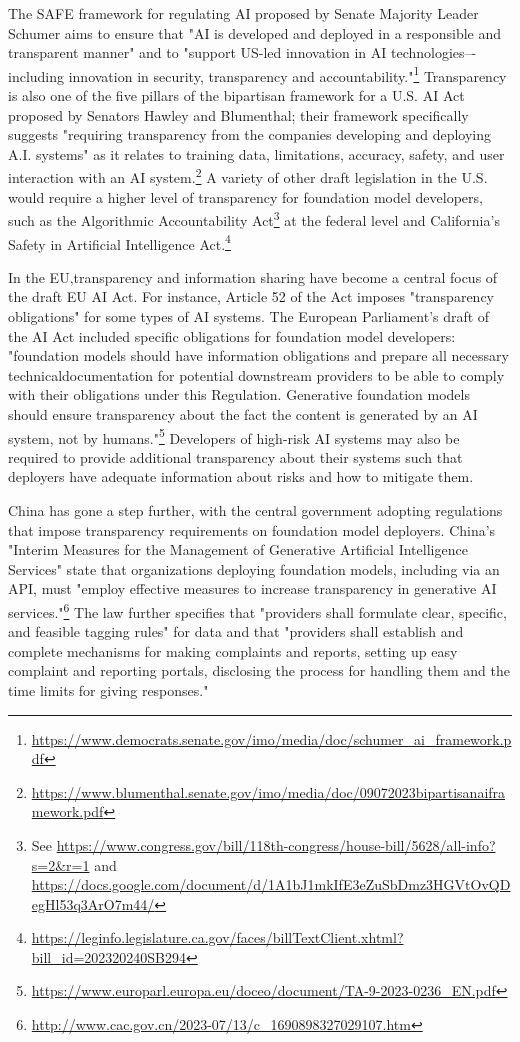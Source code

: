 \documentclass[screen, authorversion, acmsmall]{acmart}
\begin{document}
The SAFE framework for regulating AI proposed by Senate Majority Leader Schumer aims to ensure that "AI is developed and deployed in a responsible and transparent manner" and to "support US-led innovation in AI technologies–-including innovation in security, transparency and accountability."\footnote{\url{https://www.democrats.senate.gov/imo/media/doc/schumer_ai_framework.pdf}}
Transparency is also one of the five pillars of the bipartisan framework for a U.S. AI Act proposed by Senators Hawley and Blumenthal; their framework specifically suggests "requiring transparency from the companies developing and deploying A.I. systems" as it relates to training data, limitations, accuracy, safety, and user interaction with an AI system.\footnote{\url{https://www.blumenthal.senate.gov/imo/media/doc/09072023bipartisanaiframework.pdf}}
A variety of other draft legislation in the U.S. would require a higher level of transparency for foundation model developers, such as the Algorithmic Accountability Act\footnote{See \url{https://www.congress.gov/bill/118th-congress/house-bill/5628/all-info?s=2&r=1} and \url{https://docs.google.com/document/d/1A1bJ1mkIfE3eZuSbDmz3HGVtOvQDegHl53q3ArO7m44/}} at the federal level and California's Safety in Artificial Intelligence Act.\footnote{\url{https://leginfo.legislature.ca.gov/faces/billTextClient.xhtml?bill_id=202320240SB294}} 

In the EU,transparency and information sharing have become a central focus of the draft EU AI Act. 
For instance, Article 52 of the Act imposes "transparency obligations" for some types of AI systems.
The European Parliament's draft of the AI Act included specific obligations for foundation model developers: "foundation models should have information obligations and prepare all necessary technicaldocumentation for potential downstream providers to be able to comply with their obligations under this Regulation. Generative foundation models should ensure transparency about the fact the content is generated by an AI system, not by humans."\footnote{\url{https://www.europarl.europa.eu/doceo/document/TA-9-2023-0236_EN.pdf}}
Developers of high-risk AI systems may also be required to provide additional transparency about their systems such that deployers have adequate information about risks and how to mitigate them.

China has gone a step further, with the central government adopting regulations that impose transparency requirements on foundation model deployers. 
China's "Interim Measures for the Management of Generative Artificial Intelligence Services" state that organizations deploying foundation models, including via an API, must "employ effective measures to increase transparency in generative AI services."\footnote{\url{http://www.cac.gov.cn/2023-07/13/c_1690898327029107.htm}} 
The law further specifies that "providers shall formulate clear, specific, and feasible tagging rules" for data and that "providers shall establish and complete mechanisms for making complaints and reports, setting up easy complaint and reporting portals, disclosing the process for handling them and the time limits for giving responses."
\end{document}
